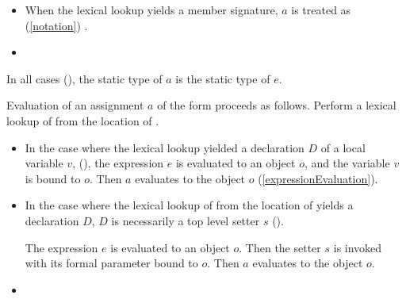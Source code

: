\documentclass[makeidx]{article}
\begin{document}
{\begin{itemize}
  If $D$ is the declaration of a static setter in class or mixin $C$
  then $a$ is treated as
  (\ref{notation})
  the assignment .


  Otherwise, a compile-time error occurs,
  unless the static type of $e$ is assignable to the parameter type of $D$.
\item
  When the lexical lookup yields a member signature,
  $a$ is treated as
  (\ref{notation})
  .

\item
\end{itemize}

\LMHash{}%
In all cases
(),
the static type of $a$ is the static type of $e$.

\LMHash{}%
Evaluation of an assignment $a$ of the form 
proceeds as follows.
Perform a lexical lookup of \code{\id=} from the location of \id.

\begin{itemize}
\item
  In the case where the lexical lookup yielded
  a declaration $D$ of a local variable $v$,
  (),
  the expression $e$ is evaluated to an object $o$,
  and the variable $v$ is bound to $o$.
  Then $a$ evaluates to the object $o$
  (\ref{expressionEvaluation}).
\item
  In the case where the lexical lookup of \code{\id=}
  from the location of \id{}
  yields a declaration $D$,
  $D$ is necessarily a top level setter $s$
  ().

  The expression $e$ is evaluated to an object $o$.
  Then the setter $s$ is invoked
  with its formal parameter bound to $o$.
  Then $a$ evaluates to the object $o$.

\item
\end{itemize}

}
\end{document}
